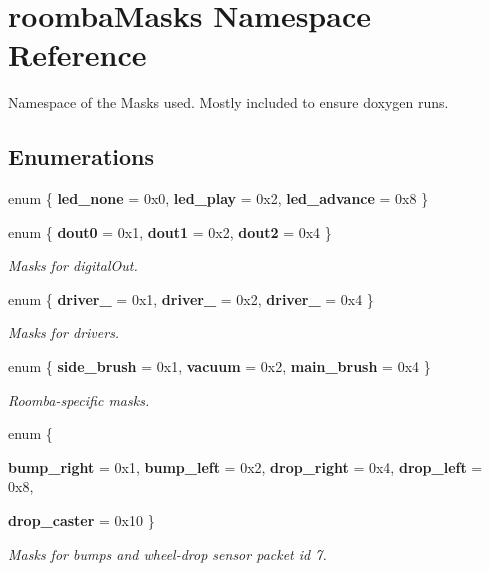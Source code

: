 \hypertarget{namespaceroomba_masks}{
\section{roombaMasks Namespace Reference}
\label{namespaceroomba_masks}
}


Namespace of the Masks used. Mostly included to ensure doxygen runs.  


\subsection*{Enumerations}
\begin{DoxyCompactItemize}
\item 
enum \{ {\bfseries led\_\-none} =  0x0, 
{\bfseries led\_\-play} =  0x2, 
{\bfseries led\_\-advance} =  0x8
 \}
\item 
enum \{ {\bfseries dout0} =  0x1, 
{\bfseries dout1} =  0x2, 
{\bfseries dout2} =  0x4
 \}
\begin{DoxyCompactList}\small\item\em Masks for digitalOut. \item\end{DoxyCompactList}\item 
enum \{ {\bfseries driver\_} =  0x1, 
{\bfseries driver\_} =  0x2, 
{\bfseries driver\_} =  0x4
 \}
\begin{DoxyCompactList}\small\item\em Masks for drivers. \item\end{DoxyCompactList}\item 
enum \{ {\bfseries side\_\-brush} =  0x1, 
{\bfseries vacuum} =  0x2, 
{\bfseries main\_\-brush} =  0x4
 \}
\begin{DoxyCompactList}\small\item\em Roomba-\/specific masks. \item\end{DoxyCompactList}\item 
enum \{ \par
{\bfseries bump\_\-right} =  0x1, 
{\bfseries bump\_\-left} =  0x2, 
{\bfseries drop\_\-right} =  0x4, 
{\bfseries drop\_\-left} =  0x8, 
\par
{\bfseries drop\_\-caster} =  0x10
 \}
\begin{DoxyCompactList}\small\item\em Masks for bumps and wheel-\/drop sensor packet id 7. \item\end{DoxyCompactList}\item 

\end{DoxyCompactItemize}
